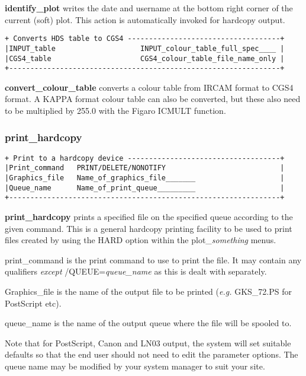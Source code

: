 {{\bf identify\_plot} writes the date and username at the bottom right 
corner of the current (soft) plot. This action is automatically invoked for
hardcopy output.

\begin{verbatim}
+ Converts HDS table to CGS4 ------------------------------------+
|INPUT_table                    INPUT_colour_table_full_spec____ |
|CGS4_table                     CGS4_colour_table_file_name_only |
+----------------------------------------------------------------+
\end{verbatim}

{\bf convert\_colour\_table} converts a colour table from IRCAM format to 
CGS4 format. A KAPPA format colour table can also be converted, but these 
also need to be multiplied by 255.0 with the Figaro ICMULT function. 

\subsubsection{print\_hardcopy}
\begin{verbatim}
+ Print to a hardcopy device ------------------------------------+
|Print_command   PRINT/DELETE/NONOTIFY                           |
|Graphics_file   Name_of_graphics_file_______                    |
|Queue_name      Name_of_print_queue_________                    |
+----------------------------------------------------------------+
\end{verbatim}

{\bf print\_hardcopy} prints a specified file on the specified queue 
according to the given command. This is a general hardcopy printing 
facility to be used to print files created by using the HARD option within 
the {\sf plot\_{\em something}} menus.

{\sf print\_command} is the print command to use to print the file. It 
may contain any qualifiers {\em except} {\sf /QUEUE={\em queue\_name}} 
as this is dealt with separately. 

{\sf Graphics\_file} is the name of the output file to be printed ({\em e.g.}
{\sf GKS\_72.PS} for PostScript etc).

{\sf queue\_name} is the name of the output queue where the file will be 
spooled to. 

Note that for PostScript, Canon and LN03 output, the system will set suitable
defaults so that the end user should not need to edit the parameter options.
The queue name may be modified by your system manager to suit your site.

}
